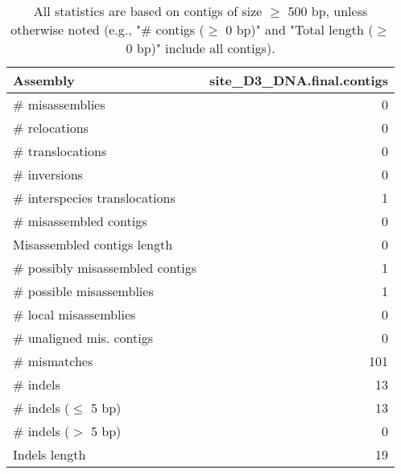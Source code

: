 \documentclass[12pt,a4paper]{article}
\begin{document}
\begin{table}[ht]
\begin{center}
\caption{All statistics are based on contigs of size $\geq$ 500 bp, unless otherwise noted (e.g., "\# contigs ($\geq$ 0 bp)" and "Total length ($\geq$ 0 bp)" include all contigs).}
\begin{tabular}{|l*{1}{|r}|}
\hline
Assembly & site\_D3\_DNA.final.contigs \\ \hline
\# misassemblies & 0 \\ \hline
\hspace{5mm}\# relocations & 0 \\ \hline
\hspace{5mm}\# translocations & 0 \\ \hline
\hspace{5mm}\# inversions & 0 \\ \hline
\hspace{5mm}\# interspecies translocations & 1 \\ \hline
\# misassembled contigs & 0 \\ \hline
Misassembled contigs length & 0 \\ \hline
\# possibly misassembled contigs & 1 \\ \hline
\hspace{5mm}\# possible misassemblies & 1 \\ \hline
\# local misassemblies & 0 \\ \hline
\# unaligned mis. contigs & 0 \\ \hline
\# mismatches & 101 \\ \hline
\# indels & 13 \\ \hline
\hspace{5mm}\# indels ($\leq$ 5 bp) & 13 \\ \hline
\hspace{5mm}\# indels ($>$ 5 bp) & 0 \\ \hline
Indels length & 19 \\ \hline
\end{tabular}
\end{center}
\end{table}
\end{document}
